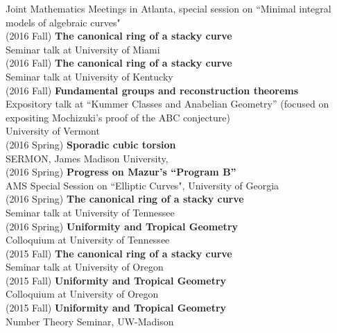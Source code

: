 \documentclass[margin,line]{res}
\begin{document}
\begin{resume}
Joint Mathematics Meetings in Atlanta, special session on ``Minimal integral models of algebraic curves"  
\vspace{.05cm}\\
(2016 Fall) \textbf{The canonical ring of a stacky curve}\\  
Seminar talk at University of Miami
\vspace{.05cm}\\
(2016 Fall) \textbf{The canonical ring of a stacky curve}\\  
Seminar talk at University of Kentucky
\vspace{.05cm}\\
(2016 Fall) \textbf{Fundamental groups and reconstruction theorems}\\ Expository talk at ``Kummer Classes and Anabelian Geometry'' (focused on expositing Mochizuki's proof of the ABC conjecture)\\ University of Vermont  
\vspace{.05cm}\\
(2016 Spring) \textbf{Sporadic cubic torsion}\\  
SERMON, James Madison University, 
\vspace{.05cm}\\
(2016 Spring) \textbf{Progress on Mazur's ``Program B''}\\  
AMS Special Session on  ``Elliptic Curves", University of Georgia
\vspace{.05cm}\\
(2016 Spring) \textbf{The canonical ring of a stacky curve}\\  
Seminar talk at University of Tennessee
\vspace{.05cm}\\
(2016 Spring) \textbf{Uniformity and Tropical Geometry}\\
Colloquium at University of Tennessee
\vspace{.05cm}\\
(2015 Fall) \textbf{The canonical ring of a stacky curve}\\  
Seminar talk at University of Oregon
\vspace{.05cm}\\
(2015 Fall) \textbf{Uniformity and Tropical Geometry}\\
Colloquium at University of Oregon
\vspace{.05cm}\\
(2015 Fall) \textbf{Uniformity and Tropical Geometry}\\
Number Theory Seminar, UW-Madison

\end{resume}
\end{document}
